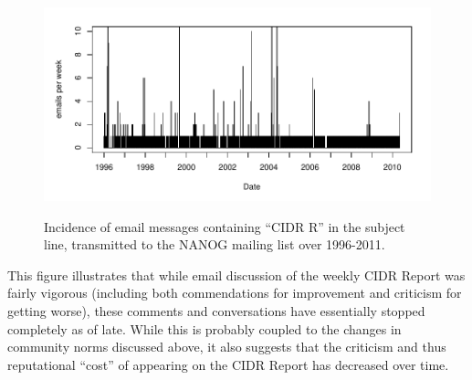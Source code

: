 \begin{figure}[h]
\begin{center}
    \includegraphics[width=6in]{figures/cr_email_freq.pdf}
    \vspace{-2em}\\
    \caption{Incidence of email messages containing ``CIDR R'' in the subject
    line, transmitted to the NANOG mailing list over 1996-2011.}
    \label{fig:mail-freq}
\end{center}
\end{figure}

This figure illustrates that while email discussion of the weekly CIDR Report
was fairly vigorous (including both commendations for improvement and criticism
for getting worse), these comments and conversations have essentially stopped
completely as of late. While this is probably coupled to the changes in
community norms discussed above, it also suggests that the criticism and thus
reputational ``cost'' of appearing on the CIDR Report has decreased over time.
